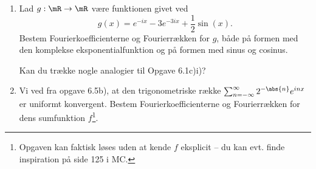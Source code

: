 \begin{opg}[Fourierrækker I]\hfill
\begin{enumerate}
	\item Lad $g: \mR \to \mR$ være funktionen givet ved
	$$ g(x) = e^{-ix} - 3 e^{-3ix} +\frac{1}{2}\sin(x). $$
	Bestem Fourierkoefficienterne og Fourierrækken for $g$, både på formen med den komplekse eksponentialfunktion og på formen med sinus og cosinus.
	    
	Kan du trække nogle analogier til Opgave 6.1c)i)?
	\iffalse\begin{proof}[Løsning]
	Lad $k\in\mZ$. Da fås
	\begin{align*}
	    c_k = \frac{1}{2\pi}\int_{-\pi}^\pi g\pare{x}e^{-ikx}\, dx
            &= \frac{1}{2\pi}\pare{\int_{-\pi}^\pi e^{-ix}e^{-ikx}\, dx
                - \int_{-\pi}^\pi 3e^{-3ix}e^{-ikx}\, dx
                + \int_{-\pi}^\pi \frac{1}{2}\sin\pare{x} e^{-ikx}\, dx} \\
            &= \frac{1}{2\pi}\pare{\int_{-\pi}^\pi e^{-i\pare{k+1}x}\, dx
                - 3\int_{-\pi}^\pi e^{-i\pare{k+3}x}\, dx
                - \frac{i}{4}\int_{-\pi}^\pi
                    e^{-i\pare{k-1}x} - e^{-i\pare{k+1}x}\, dx} \\
            &\overset{\pare{\dagger}}{=} \delta_{-k-1,0} - 3\delta_{-k-3,0}
                - \frac{i}{4}\pare{\delta_{-k+1,0} -\delta_{-k-1,0}}
	\end{align*}
	hvor $\pare{\dagger}$ følger af MC (5.1). Det følger således, at
	$$ c_{-3} = -3, \Quad 
	    c_{-1} = 1+\frac{i}{4}, \Quad
        c_1 = -\frac{i}{4}, $$
    mens de øvrige $c_k = 0$. Fourierrækken for $g$ er således givet ved
    $$ -3e^{-i3x} + \pare{1+\frac{i}{4}}e^{-ix} -\frac{i}{4}e^{ix} $$
    eller på cosinus-sinus form
    $$ -3\cos\pare{3x} + 3i\sin\pare{3x} + \cos\pare{x}
        + \pare{\frac{1}{2}-i}\sin\pare{x}. $$
    Man kan bemærke, at begge ovenstående udtryk er lig med $g$ selv, lige som vi så at Taylorrækken for et polynomium er polynomiet selv. Ovenstående er et specialtilfælde af MC 5.21.
	\end{proof}\fi
	\item Vi ved fra opgave 6.5b), at den trigonometriske række $\sum_{n=-\infty}^\infty 2^{-\abs{n}}e^{inx}$ er uniformt konvergent. Bestem Fourierkoefficienterne og Fourierrækken for dens sumfunktion $f$\footnote{Opgaven kan faktisk løses uden at kende $f$ eksplicit -- du kan evt. finde inspiration på side 125 i MC.}.


\end{enumerate}
\end{opg}
